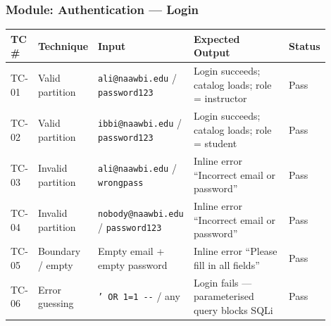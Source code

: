 \documentclass[12pt, a4paper]{article}
\begin{document}
\subsubsection*{Module: Authentication --- Login}
\begin{center}\small
\begin{tabular}{@{}p{0.06\linewidth}p{0.13\linewidth}p{0.30\linewidth}p{0.33\linewidth}p{0.08\linewidth}@{}}
  \toprule
  \textbf{TC \#} & \textbf{Technique} & \textbf{Input} & \textbf{Expected Output} & \textbf{Status} \\
  \midrule
  TC-01 & Valid partition   & \texttt{ali@naawbi.edu} / \texttt{password123}    & Login succeeds; catalog loads; role = instructor  & \textcolor{success}{Pass} \\
  TC-02 & Valid partition   & \texttt{ibbi@naawbi.edu} / \texttt{password123}   & Login succeeds; catalog loads; role = student     & \textcolor{success}{Pass} \\
  TC-03 & Invalid partition & \texttt{ali@naawbi.edu} / \texttt{wrongpass}      & Inline error ``Incorrect email or password''      & \textcolor{success}{Pass} \\
  TC-04 & Invalid partition & \texttt{nobody@naawbi.edu} / \texttt{password123} & Inline error ``Incorrect email or password''      & \textcolor{success}{Pass} \\
  TC-05 & Boundary / empty  & Empty email + empty password                      & Inline error ``Please fill in all fields''        & \textcolor{success}{Pass} \\
  TC-06 & Error guessing    & \texttt{' OR 1=1 -{}-} / any                      & Login fails --- parameterised query blocks SQLi   & \textcolor{success}{Pass} \\
  \bottomrule
\end{tabular}
\end{center}
\end{document}
